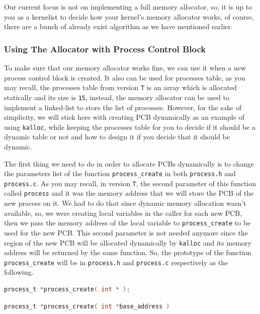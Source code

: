 Our current focus is not on implementing a full memory allocator, so, it
is up to you as a kernelist to decide how your kernel's memory allocator
works, of course, there are a bunch of already exist algorithm as we
have mentioned earlier.

\subsubsection{Using The Allocator with Process Control
Block}\label{using-the-allocator-with-process-control-block}

To make sure that our memory allocator works fine, we can use it when a
new process control block is created. It also can be used for processes
table, as you may recall, the processes table from version \lstinline!T!
is an array which is allocated statically and its size is
\lstinline!15!, instead, the memory allocator can be used to implement a
linked-list to store the list of processes. However, for the sake of
simplicity, we will stick here with creating PCB dynamically as an
example of using \lstinline!kalloc!, while keeping the processes table
for you to decide if it should be a dynamic table or not and how to
design it if you decide that it should be dynamic.

The first thing we need to do in order to allocate PCBs dynamically is
to change the parameters list of the function \lstinline!process_create!
in both \lstinline!process.h! and \lstinline!process.c!. As you may
recall, in version \lstinline!T!, the second parameter of this function
called \lstinline!process! and it was the memory address that we will
store the PCB of the new process on it. We had to do that since dynamic
memory allocation wasn't available, so, we were creating local variables
in the caller for each new PCB, then we pass the memory address of the
local variable to \lstinline!process_create! to be used for the new PCB.
This second parameter is not needed anymore since the region of the new
PCB will be allocated dynamically by \lstinline!kalloc! and its memory
address will be returned by the same function. So, the prototype of the
function \lstinline!process_create! will be in \lstinline!process.h! and
\lstinline!process.c! respectively as the following.

\begin{lstlisting}[language=C]
process_t *process_create( int * );
\end{lstlisting}

\begin{lstlisting}[language=C]
process_t *process_create( int *base_address )
\end{lstlisting}

